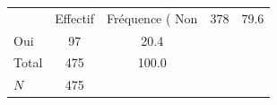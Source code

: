 {
\def\sym#1{\ifmmode^{#1}\else\(^{#1}\)\fi}
\begin{tabular}{l*{1}{cc}}
\toprule
            &    Effectif&Fréquence (%
\midrule
Non         &         378&        79.6\\
Oui         &          97&        20.4\\
Total       &         475&       100.0\\
\midrule
\(N\)       &         475&            \\
\bottomrule
\end{tabular}
}
